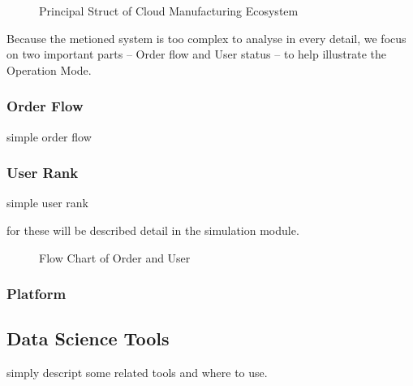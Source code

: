 \begin{figure}[!h]
\centering
\resizebox{0.7\textwidth}{!}{}
\caption{Principal Struct of Cloud Manufacturing Ecosystem}
\end{figure}
Because the metioned system is too complex to analyse in every detail, we focus on two important parts -- Order flow and User status -- to help illustrate the Operation Mode.

\subsubsection{Order Flow}
simple order flow 

\subsubsection{User Rank}
simple user rank

for these will be described detail in the simulation module.

\begin{figure}[!h]
\centering\small
{} \hspace{0.09\textwidth}
\caption{Flow Chart of Order and User}
\end{figure}
\subsubsection{Platform}


\subsection{Data Science Tools}
simply descript some related tools and where to use.
